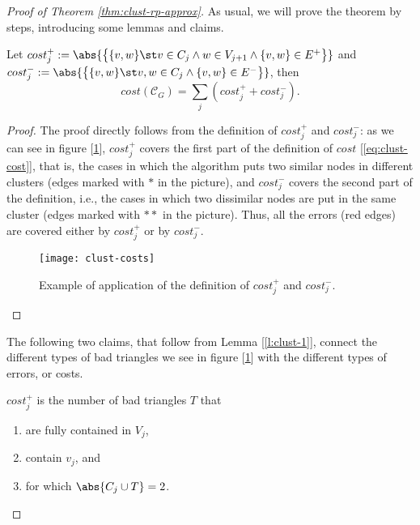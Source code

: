 \begin{proof}[Proof of Theorem \ref{thm:clust-rp-approx}]
    As usual, we will prove the theorem by steps, introducing some lemmas and claims.
    
    \begin{lem}\label{l:clust-1}
        Let $cost^+_j := \abs{\big\{ \{v,w\} \st v \in C_j \wedge w \in V_{j+1} \wedge \{v,w\} \in E^+ \big\}}$ and\\ $cost^-_j := \abs{\big\{ \{v,w\} \st v,w \in C_j \wedge \{v,w\} \in E^- \big\}}$, then
        \begin{equation}
            cost(\mathscr{C}_G) = \sum_j \left( cost_j^+ + cost_j^- \right).
        \end{equation}
    \end{lem}
    \begin{proof}
        The proof directly follows from the definition of $cost_j^+$ and $cost_j^-$: as we can see in figure [\ref{fig:clust-costs}], $cost_j^+$ covers the first part of the definition of $cost$ [\ref{eq:clust-cost}], that is, the cases in which the algorithm puts two similar nodes in different clusters (edges marked with $*$ in the picture), and $cost_j^-$ covers the second part of the definition, i.e., the cases in which two dissimilar nodes are put in the same cluster (edges marked with $**$ in the picture). Thus, all the errors (red edges) are covered either by $cost_j^+$ or by $cost_j^-$.
        
        \begin{figure}[h!]
            \centering
            \texttt{[image: clust-costs]}
            \caption{Example of application of the definition of $cost_j^+$ and $cost_j^-$.}
            \label{fig:clust-costs}
        \end{figure}
    \end{proof}

    The following two claims, that follow from Lemma [\ref{l:clust-1}], connect the different types of bad triangles we see in figure [\ref{fig:clust-costs}] with the different types of errors, or costs.
    
    \begin{claim}\label{cl:clust-1}
        $cost_j^+$ is the number of bad triangles $T$ that
        \begin{enumerate}
            \item are fully contained in $V_j$,
            \item contain $v_j$, and
            \item for which $\abs{C_j \cup T} = 2$.
        \end{enumerate}
    \end{claim}


\end{proof}
